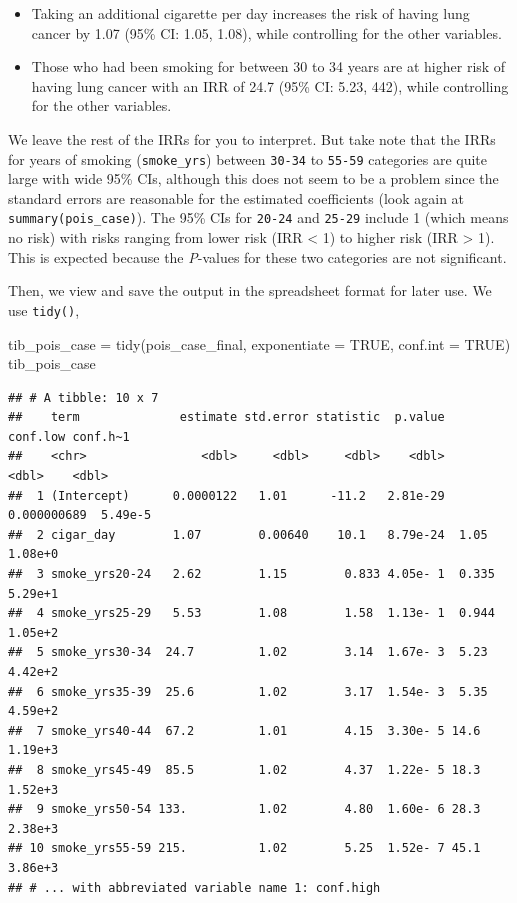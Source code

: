 \documentclass[
  10pt,
]{krantz}
\newenvironment{Shaded}{\begin{snugshade}}{\end{snugshade}}
\newcommand{\AttributeTok}[1]{\textcolor[rgb]{0.77,0.63,0.00}{#1}}
\newcommand{\ConstantTok}[1]{\textcolor[rgb]{0.00,0.00,0.00}{#1}}
\newcommand{\FunctionTok}[1]{\textcolor[rgb]{0.00,0.00,0.00}{#1}}
\newcommand{\NormalTok}[1]{#1}
\newcommand{\OtherTok}[1]{\textcolor[rgb]{0.56,0.35,0.01}{#1}}
\providecommand{\tightlist}{%
  \setlength{\itemsep}{0pt}\setlength{\parskip}{0pt}}
\begin{document}
\begin{itemize}
\tightlist
\item
  Taking an additional cigarette per day increases the risk of having lung cancer by 1.07 (95\% CI: 1.05, 1.08), while controlling for the other variables.
\item
  Those who had been smoking for between 30 to 34 years are at higher risk of having lung cancer with an IRR of 24.7 (95\% CI: 5.23, 442), while controlling for the other variables.
\end{itemize}

We leave the rest of the IRRs for you to interpret. But take note that the IRRs for years of smoking (\texttt{smoke\_yrs}) between \texttt{30-34} to \texttt{55-59} categories are quite large with wide 95\% CIs, although this does not seem to be a problem since the standard errors are reasonable for the estimated coefficients (look again at \texttt{summary(pois\_case)}). The 95\% CIs for \texttt{20-24} and \texttt{25-29} include 1 (which means no risk) with risks ranging from lower risk (IRR \textless{} 1) to higher risk (IRR \textgreater{} 1). This is expected because the \emph{P}-values for these two categories are not significant.

Then, we view and save the output in the spreadsheet format for later use. We use \texttt{tidy()},

\begin{Shaded}
\begin{Highlighting}[]
\NormalTok{tib\_pois\_case }\OtherTok{=} \FunctionTok{tidy}\NormalTok{(pois\_case\_final, }\AttributeTok{exponentiate =} \ConstantTok{TRUE}\NormalTok{, }
                     \AttributeTok{conf.int =} \ConstantTok{TRUE}\NormalTok{)}
\NormalTok{tib\_pois\_case}
\end{Highlighting}
\end{Shaded}

\begin{verbatim}
## # A tibble: 10 x 7
##    term              estimate std.error statistic  p.value     conf.low conf.h~1
##    <chr>                <dbl>     <dbl>     <dbl>    <dbl>        <dbl>    <dbl>
##  1 (Intercept)      0.0000122   1.01      -11.2   2.81e-29  0.000000689  5.49e-5
##  2 cigar_day        1.07        0.00640    10.1   8.79e-24  1.05         1.08e+0
##  3 smoke_yrs20-24   2.62        1.15        0.833 4.05e- 1  0.335        5.29e+1
##  4 smoke_yrs25-29   5.53        1.08        1.58  1.13e- 1  0.944        1.05e+2
##  5 smoke_yrs30-34  24.7         1.02        3.14  1.67e- 3  5.23         4.42e+2
##  6 smoke_yrs35-39  25.6         1.02        3.17  1.54e- 3  5.35         4.59e+2
##  7 smoke_yrs40-44  67.2         1.01        4.15  3.30e- 5 14.6          1.19e+3
##  8 smoke_yrs45-49  85.5         1.02        4.37  1.22e- 5 18.3          1.52e+3
##  9 smoke_yrs50-54 133.          1.02        4.80  1.60e- 6 28.3          2.38e+3
## 10 smoke_yrs55-59 215.          1.02        5.25  1.52e- 7 45.1          3.86e+3
## # ... with abbreviated variable name 1: conf.high
\end{verbatim}
\end{document}

